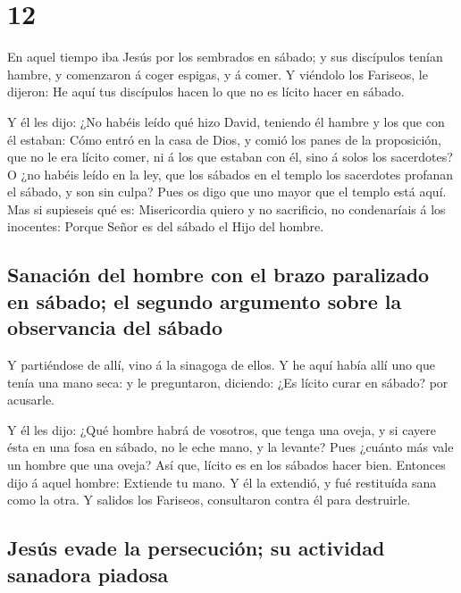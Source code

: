 \hypertarget{section-11}{%
\section{12}\label{section-11}}

 En aquel tiempo iba Jesús por los sembrados en sábado; y
sus discípulos tenían hambre, y comenzaron á coger espigas, y á comer.
 Y viéndolo los Fariseos, le dijeron: He aquí tus discípulos
hacen lo que no es lícito hacer en sábado.

 Y él les dijo: ¿No habéis leído qué hizo David, teniendo él
hambre y los que con él estaban:  Cómo entró en la casa de
Dios, y comió los panes de la proposición, que no le era lícito comer,
ni á los que estaban con él, sino á solos los sacerdotes?  O
¿no habéis leído en la ley, que los sábados en el templo los sacerdotes
profanan el sábado, y son sin culpa?  Pues os digo que uno
mayor que el templo está aquí.  Mas si supieseis qué es:
Misericordia quiero y no sacrificio, no condenaríais á los inocentes:
 Porque Señor es del sábado el Hijo del hombre.

\hypertarget{sanaciuxf3n-del-hombre-con-el-brazo-paralizado-en-suxe1bado-el-segundo-argumento-sobre-la-observancia-del-suxe1bado}{%
\subsection{Sanación del hombre con el brazo paralizado en sábado; el
segundo argumento sobre la observancia del
sábado}\label{sanaciuxf3n-del-hombre-con-el-brazo-paralizado-en-suxe1bado-el-segundo-argumento-sobre-la-observancia-del-suxe1bado}}

 Y partiéndose de allí, vino á la sinagoga de ellos.
 Y he aquí había allí uno que tenía una mano seca: y le
preguntaron, diciendo: ¿Es lícito curar en sábado? por acusarle.

 Y él les dijo: ¿Qué hombre habrá de vosotros, que tenga
una oveja, y si cayere ésta en una fosa en sábado, no le eche mano, y la
levante?  Pues ¿cuánto más vale un hombre que una oveja?
Así que, lícito es en los sábados hacer bien.  Entonces
dijo á aquel hombre: Extiende tu mano. Y él la extendió, y fué
restituída sana como la otra.  Y salidos los Fariseos,
consultaron contra él para destruirle.

\hypertarget{jesuxfas-evade-la-persecuciuxf3n-su-actividad-sanadora-piadosa}{%
\subsection{Jesús evade la persecución; su actividad sanadora
piadosa}\label{jesuxfas-evade-la-persecuciuxf3n-su-actividad-sanadora-piadosa}}

